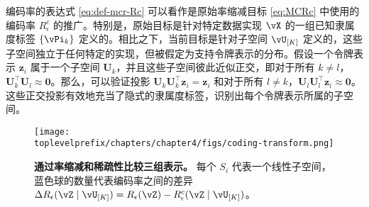 \documentclass[../../book-main.tex]{subfiles}
\begin{document}
\begin{remark}
    编码率的表达式 \eqref{eq:def-mcr-Rc} 可以看作是原始率缩减目标 \eqref{eq:MCRc} 中使用的编码率 \(R_\epsilon^{c}\) 的推广。特别是，原始目标是针对特定数据实现 \(\vX\) 的一组已知隶属度标签 \(\{\vPi_{k}\}\) 定义的。相比之下，当前目标是针对子空间 \(\vU_{[K]}\) 定义的，这些子空间独立于任何特定的实现，但被假定为支持令牌表示的分布。假设一个令牌表示 $\bm z_i$ 属于一个子空间 $\bm U_k$，并且这些子空间彼此近似正交，即对于所有 $k \neq l$，$\bm U_k^\top \bm U_l \approx \bm 0$。那么，可以验证投影 $\bm U_k\bm U_k^\top \bm z_i  = \bm z_i$ 和对于所有 $l \neq k$，$\bm U_l\bm U_l^\top \bm z_i \approx \bm 0$。这些正交投影有效地充当了隐式的隶属度标签，识别出每个令牌表示所属的子空间。
\end{remark}



\begin{figure}[t!]
     \centering
         \texttt{[image: \\toplevelprefix/chapters/chapter4/figs/coding-transform.png]}
     \caption{ \small\textbf{通过率缩减和稀疏性比较三组表示。} 每个 $S_i$ 代表一个线性子空间，蓝色球的数量代表编码率之间的差异 $\Delta R_{\epsilon}(\vZ \mid \vU_{[K]}) = R_\epsilon(\vZ) - R^c_\epsilon(\vZ \mid \vU_{[K]})$。
     }
        \label{fig:sparse-rate-reduction-diagram}
\end{figure}
\end{document}
